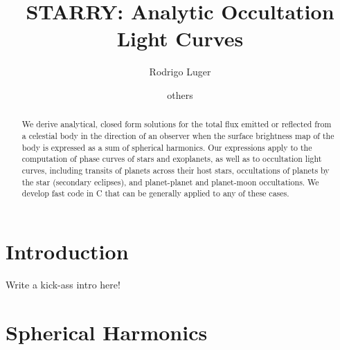 \documentclass[modern]{aastex61}
\begin{document}
\raggedbottom\sloppy\sloppypar\frenchspacing

\setlength{\abovedisplayskip}{1.5em}
\setlength{\belowdisplayskip}{1.5em}

\title{%
    \textbf{STARRY}: Analytic Occultation Light Curves
}

\author[0000-0002-0296-3826]{Rodrigo Luger}
\author{others}


\begin{abstract}
    We derive analytical, closed form solutions for the total flux
    emitted or reflected from a celestial body in the direction of
    an observer when the surface brightness map of the body is expressed
    as a sum of spherical harmonics.
    Our expressions apply to the computation of phase curves of stars and
    exoplanets, as well as to occultation light curves, including transits of
    planets across their host stars, occultations of planets by the star
    (secondary eclipses), and planet-planet and planet-moon occultations.
    We develop fast code in \textsc{C} that can be generally applied
    to any of these cases.
\end{abstract}

%
\section{Introduction}
\label{sec:intro}

Write a kick-ass intro here! 

\pagebreak
\section{Spherical Harmonics}
\label{sec:spharm}
\end{document}
